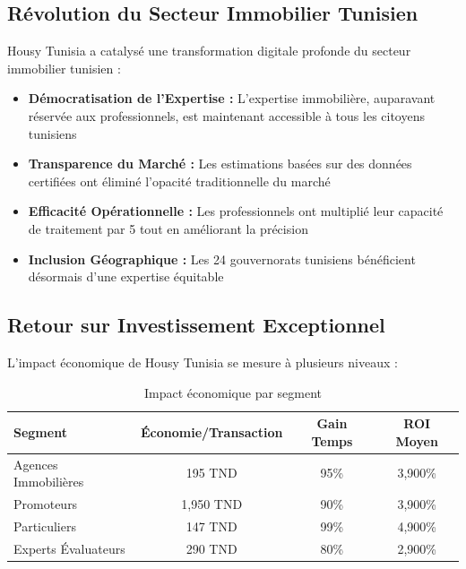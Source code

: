 \subsection{Révolution du Secteur Immobilier Tunisien}

Housy Tunisia a catalysé une transformation digitale profonde du secteur immobilier tunisien :

\begin{itemize}
    \item \textbf{Démocratisation de l'Expertise :} L'expertise immobilière, auparavant réservée aux professionnels, est maintenant accessible à tous les citoyens tunisiens
    
    \item \textbf{Transparence du Marché :} Les estimations basées sur des données certifiées ont éliminé l'opacité traditionnelle du marché
    
    \item \textbf{Efficacité Opérationnelle :} Les professionnels ont multiplié leur capacité de traitement par 5 tout en améliorant la précision
    
    \item \textbf{Inclusion Géographique :} Les 24 gouvernorats tunisiens bénéficient désormais d'une expertise équitable
\end{itemize}

\subsection{Retour sur Investissement Exceptionnel}

L'impact économique de Housy Tunisia se mesure à plusieurs niveaux :

\begin{table}[H]
\centering
\caption{Impact économique par segment}
\begin{tabular}{|l|c|c|c|}
\hline
\textbf{Segment} & \textbf{Économie/Transaction} & \textbf{Gain Temps} & \textbf{ROI Moyen} \\
\hline
Agences Immobilières & 195 TND & 95\% & 3,900\% \\
\hline
Promoteurs & 1,950 TND & 90\% & 3,900\% \\
\hline
Particuliers & 147 TND & 99\% & 4,900\% \\
\hline
Experts Évaluateurs & 290 TND & 80\% & 2,900\% \\
\hline
\end{tabular}
\end{table}

